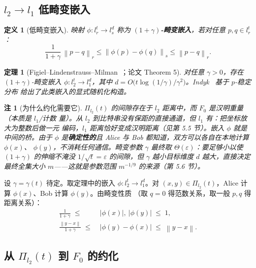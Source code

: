 \documentclass[UTF8, 11pt, a4paper, linestretch=1.15]{ctexart}
\theoremstyle{zhstyle}
\newtheorem{theorem}{定理}
\newtheorem{definition}{定义}
\newtheorem{remark}{注}
\newcommand{\eps}{\varepsilon}
\newcommand{\Fzero}{F_0}
\newcommand{\norm}[1]{\left\lVert #1 \right\rVert}
\begin{document}
	\subsection{$l_2 \to l_1$ 低畸变嵌入}
	
	\begin{definition}[低畸变嵌入]
		映射 $\phi: l_r^t \to l_s^d$ 称为 \textbf{$(1+\gamma)$-畸变嵌入}，若对任意
		$p, q \in l_r^t$：
		\[
		\frac{1}{1+\gamma}\,\norm{p - q}_r \leq \norm{\phi(p) - \phi(q)}_s \leq \norm{p - q}_r .
		\]
	\end{definition}
	
	\begin{theorem}[Figiel--Lindenstrauss--Milman~\cite{FLM77}；论文 Theorem 5]
		对任意 $\gamma > 0$，存在 $(1+\gamma)$-畸变嵌入 $\phi: l_2^t \to l_1^d$，其中
		$d = O\big(t \log(1/\gamma) / \gamma^2\big)$。Indyk~\cite{Indyk00} 基于 $p$-稳定分布
		给出了此类嵌入的显式随机化构造。
	\end{theorem}
	
	\begin{remark}[为什么约化需要它]
		$\Pi_{l_2}(t)$ 的间隙存在于 $l_2$ 距离中，而 $\Fzero$ 是汉明重量（本质是 $l_1$/计数
		量）。从 $l_2$ 到比特串没有保距的直接通道，但 $l_1$ 有：把坐标放大为整数后做一元
		编码，$l_1$ 距离恰好变成汉明距离（见第 5.5 节）。嵌入 $\phi$ 就是中间的桥。由于
		$\phi$ 是\textbf{确定性的}且 Alice 与 Bob 都知道，双方可以各自在本地计算 $\phi(x)$、
		$\phi(y)$，不消耗任何通信。畸变参数 $\gamma$ 最终取 $\Theta(\eps)$：要足够小以使
		$(1+\gamma)$ 的伸缩不淹没 $1/\sqrt{t} = \eps$ 的间隙，但 $\gamma$ 越小目标维度 $d$
		越大，直接决定最终全集大小 $m$——这就是参数范围 $m^{-1/9}$ 的来源（第 5.6 节）。
	\end{remark}
	
	设 $\gamma = \gamma(t)$ 待定。取定理中的嵌入 $\phi: l_2^t \to l_1^d$。对
	$(x, y) \in \Pi_{l_2}(t)$，Alice 计算 $\phi(x)$、Bob 计算 $\phi(y)$。由畸变性质
	（取 $q = 0$ 得范数关系，取一般 $p, q$ 得距离关系）：
	\begin{align}
		\frac{1}{1+\gamma} \;\leq\; &|\phi(x)|,\ |\phi(y)| \;\leq\; 1, \tag{1}\\
		\frac{\norm{y - x}}{1+\gamma} \;\leq\; &|\phi(y) - \phi(x)| \;\leq\; \norm{y - x}. \tag{2}
	\end{align}
	
	\subsection{从 $\Pi_{l_2}(t)$ 到 $\Fzero$ 的约化}
	
\end{document}
